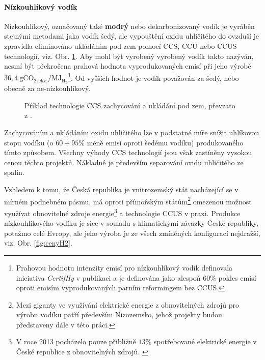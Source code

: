 \paragraph{Nízkouhlíkový vodík}
Nízkouhlíkový, označovaný také \textbf{modrý} nebo dekarbonizovaný vodík je vyráběn stejnými metodami jako vodík šedý, ale vypouštění oxidu uhličitého do ovzduší je zpravidla eliminováno ukládáním pod zem pomocí \acs{CCS}, \acs{CCU} nebo \acs{CCUS} technologií, viz. Obr. \ref{fig:CCS}. Aby mohl být vyrobený vyrobený vodík takto nazýván, nesmí být překročena prahová hodnota vyprodukovaných emisí při jeho výrobě $36,4\ \mathrm{gCO_{2,ekv.}}/\mathrm{MJ_{H_2}}$\footnote{Prahovou hodnotu intenzity emisí pro nízkouhlíkový vodík definovala iniciativa \textit{CertifHy} v publikaci \cite{Barth2016} a je definována jako alespoň $60\%$ pokles emisí oproti emisím vyprodukovaných parním reformingem bez \acs{CCUS}.}. Od vyšších hodnot je vodík považován za šedý, nebo obecně za ne-nízkouhlíkový. \cite{Griffiths2021,VodikovaStrategie}
\begin{figure}[ht]
    \centering
    
    \caption[Příklad technologie CCS zachycování a ukládání  pod zem]{Příklad technologie \acs{CCS} zachycování a ukládání  pod zem, převzato z \cite{CCS}.} \label{fig:CCS}
\end{figure}

\noindent
Zachycováním a ukládáním oxidu uhličitého lze v podstatné míře snížit uhlíkovou stopu vodíku (o $60 \div 95\%$ méně emisí oproti šedému vodíku) produkovaného tímto způsobem. \cite{Griffiths2021,VodikovaStrategie} Všechny výhody \acs{CCS} technologií jsou však zastíněny vysokou cenou těchto projektů. Nákladné je především separování oxidu uhličitého ze spalin. \cite{Seddon2022}

Vzhledem k tomu, že Česká republika je vnitrozemský stát nacházející se v mírném podnebném pásmu, má oproti přímořským státům\footnote{Mezi giganty ve využívání elektrické energie z obnovitelných zdrojů pro výrobu vodíku patří především Nizozemsko, jehož projekty budou představeny dále v této práci.} omezenou možnost využívat obnovitelné zdroje energie\footnote{V roce 2013 pocházelo pouze přibližně $13\%$ spotřebované elektrické energie v České republice z obnovitelných zdrojů. \cite{Tkac2017}} a technologie \acs{CCUS} v praxi. Produkce nízkouhlíkového vodíku je sice v souladu s klimatickými závazky České republiky, potažmo celé Evropy, ale jeho výroba je ze všech zmíněných konfigurací nejdražší, viz. Obr. \ref{fig:cenyH2}. \cite{VodikovaStrategie}


